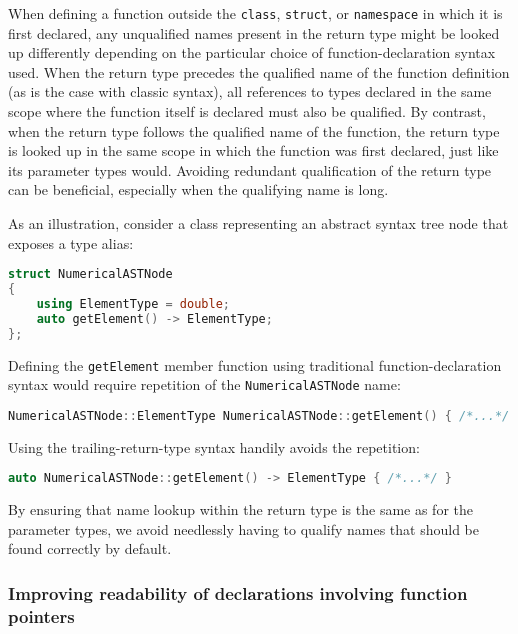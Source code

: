 When defining a function outside the \lstinline!class!, \lstinline!struct!, or
\lstinline!namespace! in which it is first declared, any unqualified names
present in the return type might be looked up differently depending on
the particular choice of function-declaration syntax used. When the
return type precedes the qualified name of the function definition (as
is the case with classic syntax), all references to types declared in
the same scope where the function itself is declared must also be
qualified. By contrast, when the return type follows the
qualified name of the function, 
the return type is looked up in the same scope in which the
function was first declared, just like its parameter types would. Avoiding redundant qualification of the return type  can be beneficial, especially when the qualifying name is long.

As an illustration, consider a class representing an abstract syntax
tree node that exposes a type alias:

\begin{lstlisting}[language=C++]
struct NumericalASTNode
{
    using ElementType = double;
    auto getElement() -> ElementType;
};
\end{lstlisting}
    
\noindent Defining the \lstinline!getElement! member function using traditional
function-declaration syntax would require repetition of the
\lstinline!NumericalASTNode! name:

\begin{lstlisting}[language=C++]
NumericalASTNode::ElementType NumericalASTNode::getElement() { /*...*/ }
\end{lstlisting}
    
\noindent Using the trailing-return-type syntax handily avoids the repetition:

\begin{lstlisting}[language=C++]
auto NumericalASTNode::getElement() -> ElementType { /*...*/ }
\end{lstlisting}
    
\noindent By ensuring that name lookup within the return type is the same as for
the parameter types, we avoid needlessly having to qualify names that
should be found correctly by default.

\subsubsection[Improving readability of declarations involving function pointers]{Improving readability of declarations involving function pointers}\label{improving-readability-of-declarations-involving-function-pointers}

